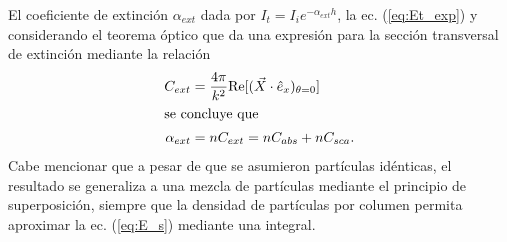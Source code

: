 \documentclass[letterpaper, 12pt] {article}
\begin{document}
El coeficiente de extinción $\alpha_{ext}$ dada por $I_t = I_i e^{-\alpha_{ext} h}$, la ec. (\ref{eq:Et_exp}) y considerando el teorema óptico que da una expresión para la sección transversal de extinción mediante la relación
\begin{align}
C_{ext} & = \frac{4\pi}{k^2}\text{Re}[(\vec{X}\cdot\hat{e}_x)_{\theta=0}] \\
\intertext{se concluye que }
\alpha_{ext} &= n C_{ext} = nC_{abs}+nC_{sca}.
\end{align}
Cabe mencionar que a pesar de que se asumieron partículas idénticas, el resultado se generaliza a una mezcla de partículas mediante el principio de superposición, siempre que la densidad de partículas por columen permita aproximar la ec. (\ref{eq:E_s}) mediante una integral.\\
\end{document}
